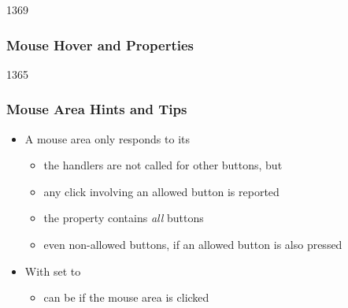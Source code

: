 
\begin{slide}{1369}\frametitle{Mouse Hover and Properties}

                                                     
\end{slide}


\begin{slide}{1365}\frametitle{Mouse Area Hints and Tips}

\begin{itemize}
\item A mouse area only responds to its 
  \begin{itemize}
  \item the handlers are not called for other buttons, but
  \item any click involving an allowed button is reported
  \item the  property contains \textit{all} buttons
  \item even non-allowed buttons, if an allowed button is also pressed
  \end{itemize}
\item With  set to 
  \begin{itemize}
  \item {} can be  if the mouse area
  is clicked
  \end{itemize}
\end{itemize}

\end{slide}


